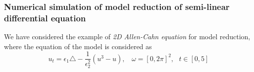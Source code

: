 \documentclass{article}
\begin{document}
\begin{table}[]
\caption{Online computation table corresponding to different methods. The mentioned complexity is required to solve the reduced system with the Runge-Kutta method.}
\label{tab:tableN1}
\end{table}

\subsubsection{Numerical simulation of model reduction of semi-linear differential equation}\label{section:sec3A1}
We have considered the example of \emph{2D Allen-Cahn equation} \cite{MatrixDEIM} for model reduction, where the equation of the model is considered as
\begin{equation}
    u_t=\epsilon_1\triangle - \frac{1}{\epsilon_2^2}(u^3-u), ~~~~\omega=[0,2\pi]^2, ~~~t\in [0,5]
\end{equation}
\end{document}
